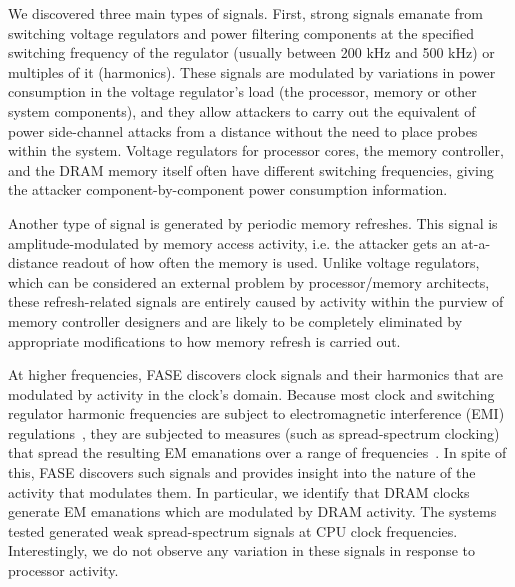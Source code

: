 We discovered three main types of signals. First, strong signals emanate from switching voltage regulators and power filtering components at the specified switching frequency of the regulator (usually between 200 kHz and 500 kHz) or multiples of it (harmonics). These signals are modulated by variations in power consumption in the voltage regulator's load (the processor, memory or other system components), and they allow attackers to carry out the equivalent of power side-channel attacks from a distance without the need to place probes within the system. Voltage regulators for processor cores, the memory controller, and the DRAM memory itself often have different switching frequencies, giving the attacker component-by-component power consumption information. %

Another type of signal is generated by periodic memory refreshes. This signal is amplitude-modulated by memory access activity, i.e. the attacker gets an at-a-distance readout of how often the memory is used. Unlike voltage regulators, which can be considered an external problem by processor/memory architects, these refresh-related signals are entirely caused by activity within the purview of memory controller designers and are likely to be completely eliminated by appropriate modifications to how memory refresh is carried out.

At higher frequencies, FASE discovers clock signals and their harmonics that are modulated by activity in the clock's domain. Because most clock and switching regulator harmonic frequencies are subject to electromagnetic interference (EMI) regulations~\cite{erickson_2001}, they are subjected to measures (such as spread-spectrum clocking) that spread the resulting EM emanations over a range of frequencies~\cite{hardin_1994}. In spite of this, FASE discovers such signals and provides insight into the nature of the activity that modulates them. In particular, we identify that DRAM clocks generate EM emanations which are modulated by DRAM activity. The systems tested generated weak spread-spectrum signals at CPU clock frequencies. Interestingly, we do not observe any variation in these signals in response to processor activity.



